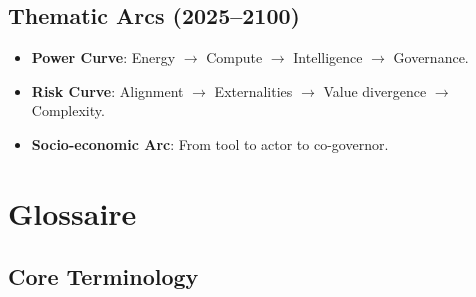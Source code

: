 \documentclass[11pt]{article}
\begin{document}
\subsection{Thematic Arcs (2025–2100)}
\begin{itemize}[noitemsep]
  \item \textbf{Power Curve}: Energy $\rightarrow$ Compute $\rightarrow$ Intelligence $\rightarrow$ Governance.
  \item \textbf{Risk Curve}: Alignment $\rightarrow$ Externalities $\rightarrow$ Value divergence $\rightarrow$ Complexity.
  \item \textbf{Socio-economic Arc}: From tool to actor to co-governor.
\end{itemize}

\clearpage

\section*{Glossaire}

\subsection*{Core Terminology}
\end{document}
